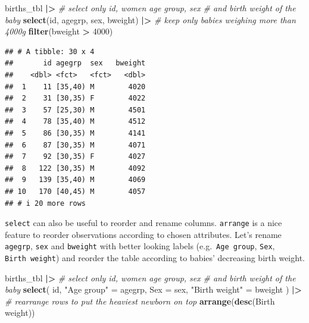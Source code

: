 \documentclass[
]{book}
\newenvironment{Shaded}{\begin{snugshade}}{\end{snugshade}}
\newcommand{\AttributeTok}[1]{\textcolor[rgb]{0.13,0.29,0.53}{#1}}
\newcommand{\CommentTok}[1]{\textcolor[rgb]{0.56,0.35,0.01}{\textit{#1}}}
\newcommand{\DecValTok}[1]{\textcolor[rgb]{0.00,0.00,0.81}{#1}}
\newcommand{\FunctionTok}[1]{\textcolor[rgb]{0.13,0.29,0.53}{\textbf{#1}}}
\newcommand{\NormalTok}[1]{#1}
\newcommand{\OtherTok}[1]{\textcolor[rgb]{0.56,0.35,0.01}{#1}}
\newcommand{\SpecialCharTok}[1]{\textcolor[rgb]{0.81,0.36,0.00}{\textbf{#1}}}
\newcommand{\StringTok}[1]{\textcolor[rgb]{0.31,0.60,0.02}{#1}}
\begin{document}
\begin{Shaded}
\begin{Highlighting}[]
\NormalTok{births\_tbl }\SpecialCharTok{|\textgreater{}}
  \CommentTok{\# select only id, women age group, sex }
  \CommentTok{\# and birth weight of the baby}
  \FunctionTok{select}\NormalTok{(id, agegrp, sex, bweight) }\SpecialCharTok{|\textgreater{}}
  \CommentTok{\# keep only babies weighing more than 4000g}
  \FunctionTok{filter}\NormalTok{(bweight }\SpecialCharTok{\textgreater{}} \DecValTok{4000}\NormalTok{)}
\end{Highlighting}
\end{Shaded}

\begin{verbatim}
## # A tibble: 30 x 4
##       id agegrp  sex   bweight
##    <dbl> <fct>   <fct>   <dbl>
##  1    11 [35,40) M        4020
##  2    31 [30,35) F        4022
##  3    57 [25,30) M        4501
##  4    78 [35,40) M        4512
##  5    86 [30,35) M        4141
##  6    87 [30,35) M        4071
##  7    92 [30,35) F        4027
##  8   122 [30,35) M        4092
##  9   139 [35,40) M        4069
## 10   170 [40,45) M        4057
## # i 20 more rows
\end{verbatim}

\texttt{select} can also be useful to reorder and rename columns.
\texttt{arrange} is a nice feature to reorder observations according to chosen attributes.
Let's rename \texttt{agegrp}, \texttt{sex} and \texttt{bweight} with better looking labels (e.g.~\texttt{Age\ group}, \texttt{Sex}, \texttt{Birth\ weight}) and reorder the table according to babies' decreasing birth weight.

\begin{Shaded}
\begin{Highlighting}[]
\NormalTok{births\_tbl }\SpecialCharTok{|\textgreater{}}
  \CommentTok{\# select only id, women age group, sex }
  \CommentTok{\# and birth weight of the baby}
  \FunctionTok{select}\NormalTok{(}
\NormalTok{    id,}
    \StringTok{"Age group"} \OtherTok{=}\NormalTok{ agegrp,}
    \AttributeTok{Sex =}\NormalTok{ sex,}
    \StringTok{"Birth weight"} \OtherTok{=}\NormalTok{ bweight}
\NormalTok{  ) }\SpecialCharTok{|\textgreater{}}
  \CommentTok{\# rearrange rows to put the heaviest newborn on top}
  \FunctionTok{arrange}\NormalTok{(}\FunctionTok{desc}\NormalTok{(}\StringTok{\textasciigrave{}}\AttributeTok{Birth weight}\StringTok{\textasciigrave{}}\NormalTok{))}
\end{Highlighting}
\end{Shaded}
\end{document}
